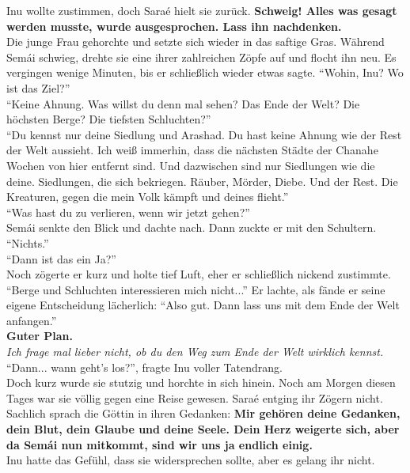 Inu wollte zustimmen, doch Saraé hielt sie zurück. \textbf{Schweig! Alles was gesagt werden musste, 
wurde ausgesprochen. Lass ihn nachdenken.}\\
Die junge Frau gehorchte und setzte sich wieder in das saftige Gras. Während Semái schwieg, drehte 
sie eine ihrer zahlreichen Zöpfe auf und flocht ihn neu. Es vergingen wenige Minuten, bis er 
schließlich wieder etwas sagte. ``Wohin, Inu? Wo ist das Ziel?''\\
``Keine Ahnung. Was willst du denn mal sehen? Das Ende der Welt? Die höchsten Berge? Die tiefsten 
Schluchten?''\\
``Du kennst nur deine Siedlung und Arashad. Du hast keine Ahnung wie der Rest der Welt aussieht. 
Ich weiß immerhin, dass die nächsten Städte der Chanahe Wochen von hier entfernt sind. Und 
dazwischen sind nur Siedlungen wie die deine. Siedlungen, die sich bekriegen. Räuber, Mörder, 
Diebe. Und der Rest. Die Kreaturen, gegen die mein Volk kämpft und deines flieht.''\\
``Was hast du zu verlieren, wenn wir jetzt gehen?''\\
Semái senkte den Blick und dachte nach. Dann zuckte er mit den Schultern. ``Nichts.''\\
``Dann ist das ein Ja?''\\
Noch zögerte er kurz und holte tief Luft, eher er schließlich nickend zustimmte. ``Berge und 
Schluchten interessieren mich nicht...'' Er lachte, als fände er seine eigene Entscheidung 
lächerlich: ``Also gut. Dann lass uns mit dem Ende der Welt anfangen.''\\
\textbf{Guter Plan.}\\
\textit{Ich frage mal lieber nicht, ob du den Weg zum Ende der Welt wirklich kennst.}\\
``Dann... wann geht's los?'', fragte Inu voller Tatendrang.\\
Doch kurz wurde sie stutzig und horchte in sich hinein. Noch am Morgen diesen Tages war sie völlig 
gegen eine Reise gewesen. Saraé entging ihr Zögern nicht. Sachlich sprach die Göttin in ihren 
Gedanken: \textbf{Mir gehören deine Gedanken, dein Blut, dein Glaube und deine Seele. Dein Herz 
weigerte sich, aber da Semái nun mitkommt, sind wir uns ja endlich einig.}\\
Inu hatte das Gefühl, dass sie widersprechen sollte, aber es gelang ihr nicht.\\

